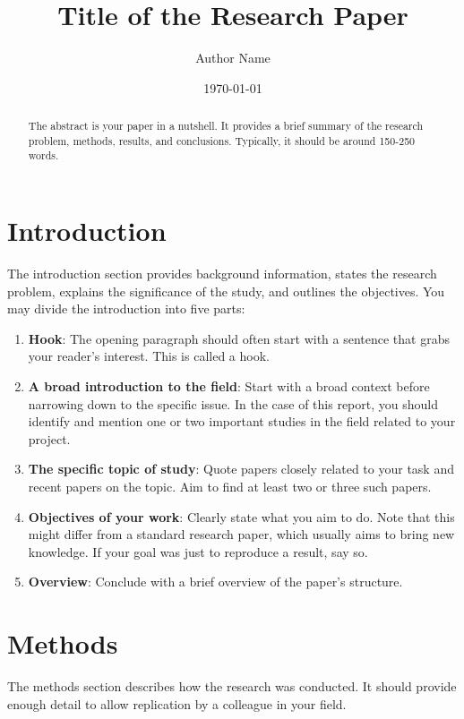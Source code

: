 \documentclass[a4paper,12pt]{article}
\title{Title of the Research Paper}
\author{Author Name}
\date{\today}
\begin{document}
\maketitle

\begin{abstract}
The abstract is your paper in a nutshell. It provides a brief summary of the research problem, methods, results, and conclusions. Typically, it should be around 150-250 words.
\end{abstract}

\section{Introduction}
The introduction section provides background information, states the research problem, explains the significance of the study, and outlines the objectives. You may divide the introduction into five parts:
\begin{enumerate}
    \item \textbf{Hook}: The opening paragraph should often start with a sentence that grabs your reader's interest. This is called a hook.
    \item \textbf{A broad introduction to the field}: Start with a broad context before narrowing down to the specific issue. In the case of this report, you should identify and mention one or two important studies in the field related to your project.
    \item \textbf{The specific topic of study}: Quote papers closely related to your task and recent papers on the topic. Aim to find at least two or three such papers.
    \item \textbf{Objectives of your work}: Clearly state what you aim to do. Note that this might differ from a standard research paper, which usually aims to bring new knowledge. If your goal was just to reproduce a result, say so.
    \item \textbf{Overview}: Conclude with a brief overview of the paper's structure.
\end{enumerate}

\section{Methods}
The methods section describes how the research was conducted. It should provide enough detail to allow replication by a colleague in your field. 
\end{document}
